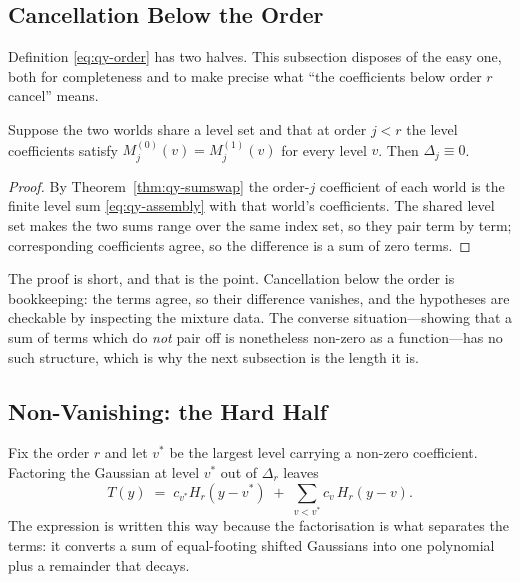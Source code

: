 \subsection{Cancellation Below the Order}
\label{sec:qy-cancel}

Definition \eqref{eq:qy-order} has two halves. This subsection disposes of the easy one, both
for completeness and to make precise what ``the coefficients below order $r$ cancel'' means.

\begin{theorem}
\label{thm:qy-cancel}
Suppose the two worlds share a level set and that at order $j<r$ the level coefficients
satisfy $M^{(0)}_{j}(v)=M^{(1)}_{j}(v)$ for every level $v$. Then $\Delta_{j}\equiv0$.
\end{theorem}

\begin{proof}
By Theorem~\ref{thm:qy-sumswap} the order-$j$ coefficient of each world is the finite level sum
\eqref{eq:qy-assembly} with that world's coefficients. The shared level set makes the two sums
range over the same index set, so they pair term by term; corresponding coefficients agree,
so the difference is a sum of zero terms.
\end{proof}


The proof is short, and that is the point. Cancellation below the order is bookkeeping: the
terms agree, so their difference vanishes, and the hypotheses are checkable by inspecting
the mixture data. The converse situation---showing that a sum of terms which do \emph{not}
pair off is nonetheless non-zero as a function---has no such structure, which is why the next
subsection is the length it is.

\subsection{Non-Vanishing: the Hard Half}
\label{sec:qy-nonvanish}

Fix the order $r$ and let $v^{*}$ be the largest level carrying a non-zero coefficient.
Factoring the Gaussian at level $v^{*}$ out of $\Delta_{r}$ leaves
\begin{equation}
T(y)\;=\;c_{v^{*}}H_{r}(y-v^{*})\;+\;\sum_{v<v^{*}}c_{v}\,H_{r}(y-v).
\label{eq:qy-nonvanish}
\end{equation}
The expression is written this way because the factorisation is what separates the terms: it
converts a sum of equal-footing shifted Gaussians into one polynomial plus a remainder that
decays.

